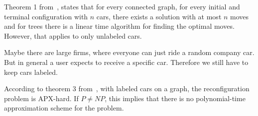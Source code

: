 Theorem 1 from~\cite{calinescu2008reconfigurations}, states that for every
connected graph, for every initial and terminal configuration with $n$ cars,
there exists a solution with at most $n$ moves and for trees there is a linear
time algorithm for finding the optimal moves. However, that applies to only
unlabeled cars.

Maybe there are large firms, where everyone can just ride a random company car.
But in general a user expects to receive a specific car. Therefore we still
have to keep cars labeled. 

According to theorem 3 from~\cite{calinescu2008reconfigurations}, with labeled
cars on a graph, the reconfiguration problem is APX-hard. If $P\neq NP$, this
implies that there is no polynomial-time approximation scheme for the problem.
